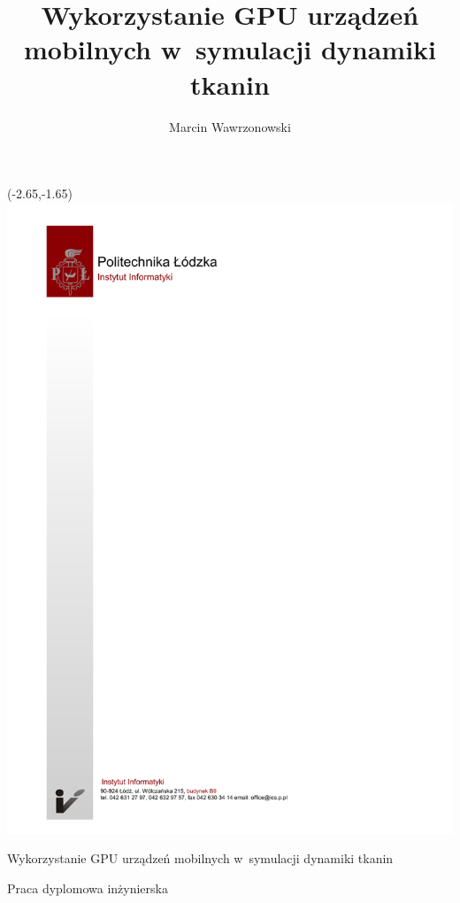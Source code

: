 \documentclass[12pt, oneside, a4paper]{mwbk}
\begin{document}
\author{Marcin Wawrzonowski}
\title{Wykorzystanie GPU urządzeń mobilnych w~symulacji dynamiki tkanin}
\begin{titlepage}
\thispagestyle{empty}
\begin{textblock}{1}(-2.65,-1.65)
\includegraphics{figures/tytulowa_pusta_mgrinz.pdf}
\end{textblock}
\vspace{7.3cm}
\begin{center}
\selectfont
\Huge
Wykorzystanie GPU urządzeń mobilnych w~symulacji dynamiki tkanin
\end{center}
\begin{center}
\selectfont
Praca dyplomowa inżynierska
\end{center}
\vspace{7.9cm}
\begin{center}

\end{center}
\end{titlepage}
\end{document}
